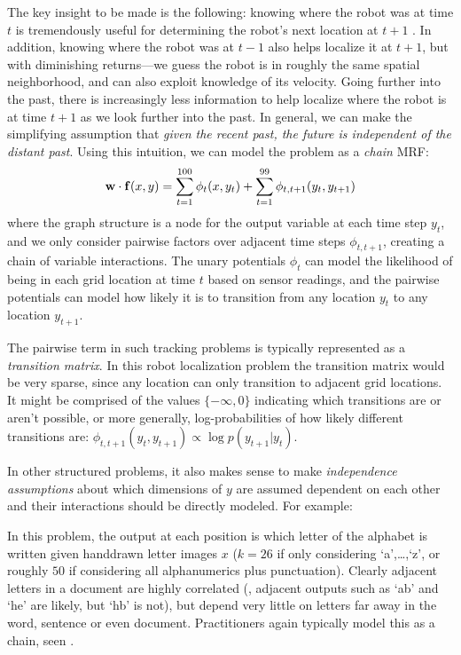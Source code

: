 The key insight to be made is the following: knowing where the robot was at 
time $t$ is tremendously useful for determining the robot's next location at 
$t+1$ .  In addition, knowing where the robot was at $t-1$ also helps localize 
it at $t+1$, but with diminishing returns---we guess the robot is in roughly 
the same spatial neighborhood, and can also exploit knowledge of its velocity.  
Going further into the past, there is increasingly less information to help 
localize where the robot is at time $t+1$ as we look further into the past.
In general, we can make the simplifying assumption that {\em given the recent 
past, the future is independent of the distant past}.  Using this intuition, we 
can model the problem as a {\em chain} MRF:
\begin{equation}
\mathbf{w} \cdot \mathbf{f}(x,y) = \sum_{t=1}^{100} \phi_t(x,y_t) + \sum_{t=1}^{99} 
\phi_{t,t+1}(y_t,y_{t+1})
\end{equation}
where the graph structure is a node for the output variable at each time step 
$y_t$, and we only consider pairwise factors over adjacent time steps 
$\phi_{t,t+1}$, creating a chain of variable interactions.  The unary 
potentials $\phi_t$ can model the likelihood of being in each grid location at 
time $t$ based on sensor readings, and the pairwise potentials can model how 
likely it is to transition from any location $y_t$ to any location $y_{t+1}$.  

The pairwise term in such tracking problems is typically represented as a {\em 
transition matrix}.  In this robot localization problem the transition matrix 
would be very sparse, since any location can only transition to adjacent grid 
locations.  It might be comprised of the values $\{-\infty,0\}$ indicating 
which transitions are or aren't possible, or more generally, log-probabilities 
of how likely different transitions are: $\phi_{t,t+1}(y_t,y_{t+1}) \propto 
\log p(y_{t+1} | y_t)$.


In other structured problems, it also makes sense to make {\em independence 
assumptions} about which dimensions of $y$ are assumed dependent on each other 
and their interactions should be directly modeled. For example: 

 In this problem, the output at each position is 
which letter of the alphabet is written given handdrawn letter images $x$ 
($k=26$ if only considering `a',\ldots,`z', or roughly $50$ if considering all 
alphanumerics plus punctuation).  Clearly adjacent letters in a document are 
highly correlated (\eg, adjacent outputs such as `ab' and `he' are likely, but 
`hb' is not), but depend very little on letters far away in the word, sentence 
or even document.  Practitioners again typically model this as a chain, seen 
.

